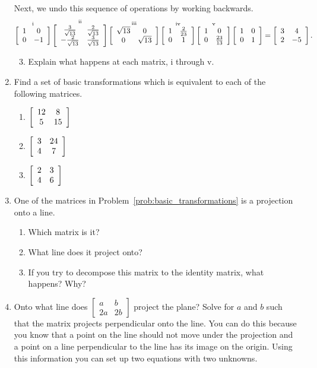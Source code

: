 \documentclass[../gatm.tex]{subfiles}
\begin{document}
\begin{enumerate}
\begin{enumerate}
\end{enumerate}
Next, we undo this sequence of operations by working backwards.
\vspace{-2ex}
$$\mathop{\left[\begin{array}{cc} 1 & 0 \\ 0 & -1 \end{array}\right]}^{\text{i}}
\mathop{\left[\begin{array}{cc} \frac{3}{\sqrt{13}} & \frac{2}{\sqrt{13}} \\ -\frac{2}{\sqrt{13}} & \frac{3}{\sqrt{13}} \end{array}\right]}^{\text{ii}}
\mathop{\left[\begin{array}{cc} \sqrt{13} & 0 \\ 0 & \sqrt{13} \end{array}\right]}^{\text{iii}}
\mathop{\left[\begin{array}{cc} 1 & \frac{2}{23} \\ 0 & 1 \end{array}\right]}^{\text{iv}}
\mathop{\left[\begin{array}{cc} 1 & 0 \\ 0 & \frac{23}{13} \end{array}\right]}^{\text{v}}
\left[\begin{array}{cc} 1 & 0 \\ 0 & 1 \end{array}\right]=\left[\begin{array}{cc} 3 & 4 \\ 2 & -5 \end{array}\right].$$
\begin{enumerate}
\setcounter{enumii}{2}
\item Explain what happens at each matrix, i through v.
\end{enumerate}
\item Find a set of basic transformations which is equivalent to each of the following matrices.\label{prob:basic_transformations}
\begin{multicols}{3}
\begin{enumerate}
\item $\left[\begin{array}{cc} 12 & 8 \\ 5 & 15 \end{array}\right]$
\item $\left[\begin{array}{cc} 3 & 24 \\ 4 & 7 \end{array}\right]$
\item $\left[\begin{array}{cc} 2 & 3 \\ 4 & 6 \end{array}\right]$
\end{enumerate}
\end{multicols}
\item One of the matrices in Problem~\ref{prob:basic_transformations} is a projection onto a line.
\begin{multicols}{2}
\begin{enumerate}
\item Which matrix is it?
\item What line does it project onto?
\item If you try to decompose this matrix to the identity matrix, what happens? Why?
\end{enumerate}
\end{multicols}
\item Onto what line does $\left[\begin{smallmatrix} a & b \\ 2a & 2b\end{smallmatrix}\right]$ project the plane? Solve for $a$ and $b$ such that the matrix projects perpendicular onto the line. You can do this because you know that a point on the line should not move under the projection and a point on a line perpendicular to the line has its image on the origin. Using this information you can set up two equations with two unknowns. \label{prob:project_the_plane}

\end{enumerate}
\end{document}
